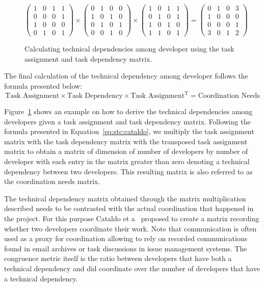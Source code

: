 \begin{figure}[t!]
\centering
\[
\left(
\begin{matrix}
1 & 0 & 1 & 1\\
0 & 0 & 0 & 1\\
1 & 0 & 0 & 0\\
0 & 1 & 0 & 1
\end{matrix}
\right)
\times
\left(
\begin{matrix}
0 & 1 & 0 & 0\\
1 & 0 & 1 & 0\\
0 & 1 & 0 & 1\\
0 & 0 & 1 & 0
\end{matrix}
\right)
\times
\left(
\begin{matrix}
1 & 0 & 1 & 1\\
0 & 1 & 0 & 1\\
1 & 0 & 1 & 0\\
1 & 1 & 0 & 1
\end{matrix}
\right)
=
\left(
\begin{matrix}
0 & 1 & 0 & 3\\
1 & 0 & 0 & 0\\
0 & 0 & 0 & 1\\
3 & 0 & 1 & 2
\end{matrix}
\right)
\]
\caption{Calculating technical dependencies among developer using the task assignment and task dependency matrix.}
\label{chap:3:fig:example:stc:cataldo}
\end{figure}
The final calculation of the technical dependency among developer follows the formula presented below:
\begin{equation}
\label{eq:stc:cataldo}
\text{Task Assignment} \times \text{Task Dependency} \times \text{Task Assignment}^{\text{T}} = \text{Coordination Needs}
\end{equation}

Figure~\ref{chap:3:fig:example:stc:cataldo} shows an example on how to derive the technical dependencies among developers given a task assignment and task dependency matrix.
Following the formula presented in Equation~\ref{eq:stc:cataldo}, we multiply the task assignment matrix with the task dependency matrix with the transposed task assignment matrix to obtain a matrix of dimension of number of developers by number of developer with each entry in the matrix greater than zero denoting a technical dependency between two developers.
This resulting matrix is also referred to as the coordination needs matrix.

The technical dependency matrix obtained through the matrix multiplication described needs to be contrasted with the actual coordination that happened in the project.
For this purpose Cataldo et a~\cite{cataldo:cscw:2006} proposed to create a matrix recording whether two developers coordinate their work.
Note that communication is often~\cite{cataldo:cscw:2006,kwan:tse:2011,valetto:msr:2007,ducheneaut:cscw:2005,ehrlich:stc:2008,wolf:icse:2009} used as a proxy for coordination allowing to rely on recorded communications found in email archives or task discussions in issue management systems.
The congruence metric itself is the ratio between developers that have both a technical dependency and did coordinate over the number of developers that have a technical dependency.

